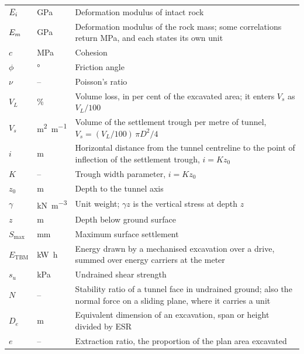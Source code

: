 \begin{longtable}{ll>{\raggedright\arraybackslash}p{}}
$E_i$ & \si{\giga\pascal} & Deformation modulus of intact rock \\
$E_{m}$ & \si{\giga\pascal} & Deformation modulus of the rock mass; some correlations return \si{\mega\pascal}, and each states its own unit \\
$c$ & \si{\mega\pascal} & Cohesion \\
$\phi$ & \si{\degree} & Friction angle \\
$\nu$ & -- & Poisson's ratio \\
$V_L$ & \si{\percent} & Volume loss, in per cent of the excavated area; it enters $V_s$ as $V_L/100$ \\
$V_s$ & \si{\metre\squared\per\metre} & Volume of the settlement trough per metre of tunnel, $V_s = (V_L/100)\,\pi D^2/4$ \\
$i$ & \si{\metre} & Horizontal distance from the tunnel centreline to the point of inflection of the settlement trough, $i = K z_0$ \\
$K$ & -- & Trough width parameter, $i = K z_0$ \\
$z_0$ & \si{\metre} & Depth to the tunnel axis \\
$\gamma$ & \si{\kilo\newton\per\cubic\metre} & Unit weight; $\gamma z$ is the vertical stress at depth $z$ \\
$z$ & \si{\metre} & Depth below ground surface \\
$S_{\max}$ & \si{\milli\metre} & Maximum surface settlement \\
$E_{\mathrm{TBM}}$ & \si{\kilo\watt\hour} & Energy drawn by a mechanised excavation over a drive, summed over energy carriers at the meter \\
$s_u$ & \si{\kilo\pascal} & Undrained shear strength \\
$N$ & -- & Stability ratio of a tunnel face in undrained ground; also the normal force on a sliding plane, where it carries a unit \\
$D_e$ & \si{\metre} & Equivalent dimension of an excavation, span or height divided by ESR \\
$e$ & -- & Extraction ratio, the proportion of the plan area excavated \\
\bottomrule
\end{longtable}
